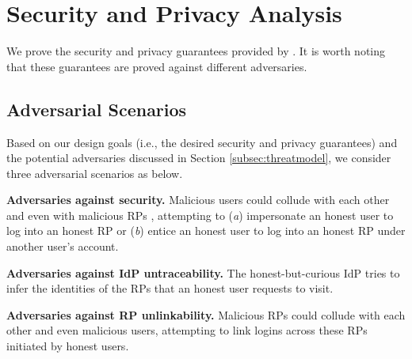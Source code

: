 \section{Security and Privacy Analysis}
\label{sec:analysis}

We prove the security and privacy guarantees provided by \usso.
It is worth noting that these guarantees are proved against different adversaries.


\subsection{Adversarial Scenarios}

Based on our design goals (i.e., the desired security and privacy guarantees) and the potential adversaries discussed in Section \ref{subsec:threatmodel}, we consider three adversarial scenarios as below.

\noindent\textbf{Adversaries against security.} Malicious users could collude with each other and even with malicious RPs \cite{FettKS14,BrowserID,SPRESSO}, attempting to (\emph{a}) impersonate an honest user to log into an honest RP or (\emph{b}) entice an honest user to log into an honest RP under another user's account.

\noindent\textbf{Adversaries against IdP untraceability.}
The honest-but-curious IdP tries to infer the identities of the RPs that an honest user requests to visit.

\noindent\textbf{Adversaries against RP unlinkability.}
Malicious RPs could collude with each other and even malicious users, attempting to link logins across these RPs initiated by honest users. 



